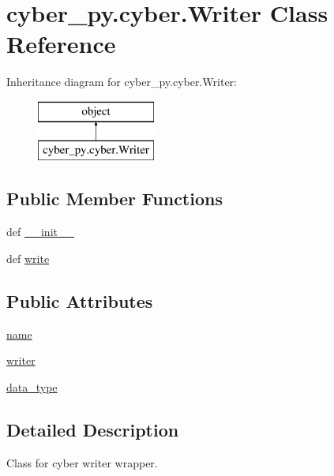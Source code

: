 \hypertarget{classcyber__py_1_1cyber_1_1Writer}{\section{cyber\-\_\-py.\-cyber.\-Writer Class Reference}
\label{classcyber__py_1_1cyber_1_1Writer}
}
Inheritance diagram for cyber\-\_\-py.\-cyber.\-Writer\-:\begin{figure}[H]
\begin{center}
\leavevmode
\includegraphics[height=2.000000cm]{classcyber__py_1_1cyber_1_1Writer}
\end{center}
\end{figure}
\subsection*{Public Member Functions}
\begin{DoxyCompactItemize}
\item 
def \hyperlink{classcyber__py_1_1cyber_1_1Writer_a1c8622d8858c2703dedd6527fc1c654b}{\-\_\-\-\_\-init\-\_\-\-\_\-}
\item 
def \hyperlink{classcyber__py_1_1cyber_1_1Writer_a5ef5ce319cfcb085266ffa8e6cb6cae2}{write}
\end{DoxyCompactItemize}
\subsection*{Public Attributes}
\begin{DoxyCompactItemize}
\item 
\hyperlink{classcyber__py_1_1cyber_1_1Writer_aae9aa5c2f9390d4ab157294a29c7d2a2}{name}
\item 
\hyperlink{classcyber__py_1_1cyber_1_1Writer_a560cf803725f9c259059956211418582}{writer}
\item 
\hyperlink{classcyber__py_1_1cyber_1_1Writer_a9ad78a9c6ec32e9cc9f56cff9c6be6ad}{data\-\_\-type}
\end{DoxyCompactItemize}


\subsection{Detailed Description}
\begin{DoxyVerb}Class for cyber writer wrapper.
\end{DoxyVerb}
 

